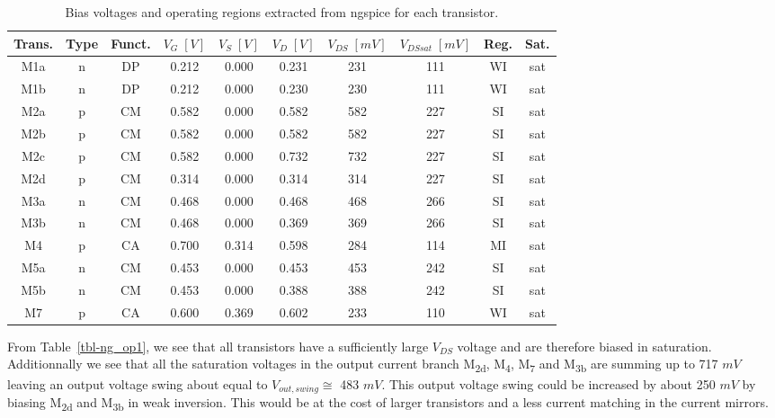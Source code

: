 \documentclass[
  a4paper,
  DIV=11,
  numbers=noendperiod]{scrreprt}
\begin{document}
\begin{longtable}[]{@{}cccccccccc@{}}

\caption{\label{tbl-ng_bias}Bias voltages and operating regions
extracted from ngspice for each transistor.}

\tabularnewline

\toprule\noalign{}
Trans. & Type & Funct. & \(V_G\;[V]\) & \(V_S\;[V]\) & \(V_D\;[V]\) &
\(V_{DS}\;[mV]\) & \(V_{DSsat}\;[mV]\) & Reg. & Sat. \\
\midrule\noalign{}
\endhead
\bottomrule\noalign{}
\endlastfoot
M1a & n & DP & 0.212 & 0.000 & 0.231 & 231 & 111 & WI & sat \\
M1b & n & DP & 0.212 & 0.000 & 0.230 & 230 & 111 & WI & sat \\
M2a & p & CM & 0.582 & 0.000 & 0.582 & 582 & 227 & SI & sat \\
M2b & p & CM & 0.582 & 0.000 & 0.582 & 582 & 227 & SI & sat \\
M2c & p & CM & 0.582 & 0.000 & 0.732 & 732 & 227 & SI & sat \\
M2d & p & CM & 0.314 & 0.000 & 0.314 & 314 & 227 & SI & sat \\
M3a & n & CM & 0.468 & 0.000 & 0.468 & 468 & 266 & SI & sat \\
M3b & n & CM & 0.468 & 0.000 & 0.369 & 369 & 266 & SI & sat \\
M4 & p & CA & 0.700 & 0.314 & 0.598 & 284 & 114 & MI & sat \\
M5a & n & CM & 0.453 & 0.000 & 0.453 & 453 & 242 & SI & sat \\
M5b & n & CM & 0.453 & 0.000 & 0.388 & 388 & 242 & SI & sat \\
M7 & p & CA & 0.600 & 0.369 & 0.602 & 233 & 110 & WI & sat \\

\end{longtable}

From Table~\ref{tbl-ng_op1}, we see that all transistors have a
sufficiently large \(V_{DS}\) voltage and are therefore biased in
saturation. Additionnally we see that all the saturation voltages in the
output current branch M\textsubscript{2d}, M\textsubscript{4},
M\textsubscript{7} and M\textsubscript{3b} are summing up to 717 \(mV\)
leaving an output voltage swing about equal to \(V_{out,swing} \cong\)
483 \(mV\). This output voltage swing could be increased by about 250
\(mV\) by biasing M\textsubscript{2d} and M\textsubscript{3b} in weak
inversion. This would be at the cost of larger transistors and a less
current matching in the current mirrors.
\end{document}
